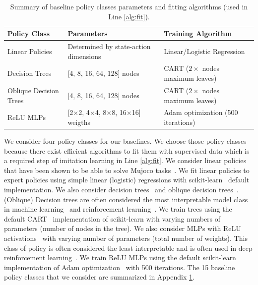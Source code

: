 \begin{table}[ht]
\centering
\small
\begin{tabular}{lll}
\hline
\textbf{Policy Class} & \textbf{Parameters} & \textbf{Training Algorithm} \\
\hline
Linear Policies & Determined by state-action dimensions & Linear/Logistic Regression \\
Decision Trees & [4, 8, 16, 64, 128] nodes & CART ($2\times$ nodes maximum leaves) \\
Oblique Decision Trees & [4, 8, 16, 64, 128] nodes & CART ($2\times$ nodes maximum leaves) \\
ReLU MLPs & [2$\times$2, 4$\times$4, 8$\times$8, 16$\times$16] weigths & Adam optimization (500 iterations) \\
\hline
\end{tabular}
\caption{Summary of baseline policy classes parameters and fitting algorithms (used in Line \ref{alg:fit}).}
\label{tab:policy-classes}
\end{table}

 We consider four policy classes for our baselines. We choose those policy classes because there exist efficient algorithms to fit them with supervised data which is a required step of imitation learning in Line \ref{alg:fit}. We consider linear policies that have been shown to be able to solve Mujoco tasks~\cite{empirical-evidence}. We fit linear policies to expert policies using simple linear (logistic) regressions with scikit-learn~\cite{scikit-learn} default implementation. We also consider decision trees~\cite{cart} and oblique decision trees~\cite{oblique}. (Oblique) Decision trees are often considered the most interpretable model class in machine learning~\cite{mythos} and reinforcement learning~\cite{viper,IBMDP,glanois-survey,milani-survey}. We train trees using the default CART~\cite{cart} implementation of scikit-learn with varying numbers of parameters (number of nodes in the tree). We also consider MLPs with ReLU activations~\cite{relunet} with varying number of parameters (total number of weights). This class of policy is often considered the least interpretable and is often used in deep reinforcement learning~\cite{deep-rl-relu1,deep-rl-relu2,deep-rl-relu3}. We train ReLU MLPs using the default scikit-learn implementation of Adam optimization~\cite{adam} with 500 iterations. The 15 baseline policy classes that we consider are summarized in Appendix \ref{tab:policy-classes}. 
